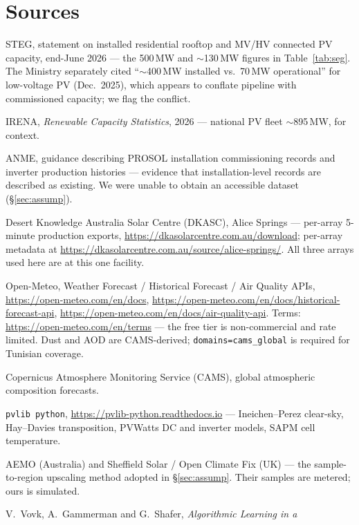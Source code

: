 \documentclass[11pt,a4paper]{article}
\newcommand{\unit}[1]{\,\textsf{\small #1}}
\begin{document}
\section*{Sources}
\footnotesize
\begin{enumerate}[label={[\arabic*]}]
\item STEG, statement on installed residential rooftop and MV/HV connected PV
capacity, end-June 2026 --- the 500\unit{MW} and $\sim$130\unit{MW} figures in
Table~\ref{tab:seg}. The Ministry separately cited ``$\sim$400\unit{MW} installed
vs.\ 70\unit{MW} operational'' for low-voltage PV (Dec.\ 2025), which appears to
conflate pipeline with commissioned capacity; we flag the conflict.
\item IRENA, \emph{Renewable Capacity Statistics}, 2026 --- national PV fleet
$\sim$895\unit{MW}, for context.
\item ANME, guidance describing PROSOL installation commissioning records and
inverter production histories --- evidence that installation-level records are
described as existing. We were unable to obtain an accessible dataset
(\S\ref{sec:assump}).
\item Desert Knowledge Australia Solar Centre (DKASC), Alice Springs --- per-array
5-minute production exports, \url{https://dkasolarcentre.com.au/download};
per-array metadata at \url{https://dkasolarcentre.com.au/source/alice-springs/}.
All three arrays used here are at this one facility.
\item Open-Meteo, Weather Forecast / Historical Forecast / Air Quality APIs,
\url{https://open-meteo.com/en/docs}, \url{https://open-meteo.com/en/docs/historical-forecast-api},
\url{https://open-meteo.com/en/docs/air-quality-api}. Terms:
\url{https://open-meteo.com/en/terms} --- the free tier is non-commercial and
rate limited. Dust and AOD are CAMS-derived; \texttt{domains=cams\_global} is
required for Tunisian coverage.
\item Copernicus Atmosphere Monitoring Service (CAMS), global atmospheric
composition forecasts.
\item \texttt{pvlib python}, \url{https://pvlib-python.readthedocs.io} ---
Ineichen--Perez clear-sky, Hay--Davies transposition, PVWatts DC and inverter
models, SAPM cell temperature.
\item AEMO (Australia) and Sheffield Solar / Open Climate Fix (UK) --- the
sample-to-region upscaling method adopted in \S\ref{sec:assump}. Their samples
are metered; ours is simulated.
\item V.\ Vovk, A.\ Gammerman and G.\ Shafer, \emph{Algorithmic Learning in a
}
\end{enumerate}
\end{document}
